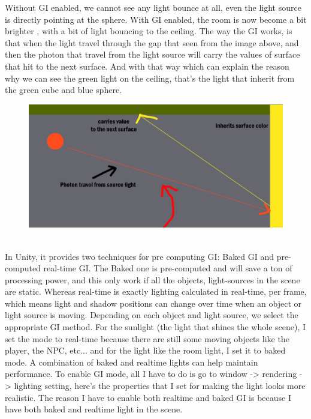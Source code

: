 \documentclass[a4paper, 13pt]{extarticle}
\begin{document}
{\begin{figure}[h]
 \end{figure}
 Without GI enabled, we cannot see any light bounce at all, even the light source is directly pointing at the sphere. With GI enabled, the room is now become a bit brighter , with a bit of light bouncing to the ceiling. The way the GI works, is that when the light travel through the gap that seen from the image above, and then the photon that travel from the light source will carry the values of surface that hit to the next surface. And with that way which can explain the reason why we can see the green light on the ceiling, that's the light that inherit from the green cube and blue sphere. 
  \begin{figure}[h]
 	\begin{minipage}{1\textwidth}
 		\centering
 		\includegraphics[width=0.8\linewidth]{intructions/How_light_works.png}
 		\centering
 	\end{minipage}
 \end{figure}
\\[0.05cm]
 In Unity, it provides two techniques for pre computing GI: Baked GI and pre-computed real-time GI. The Baked one is pre-computed and will save a ton of processing power, and this only work if all the objects, light-sources in the scene are static. Whereas real-time is exactly lighting calculated in real-time, per frame, which means light and shadow positions can change over time when an object or light source is moving. Depending on each object and light source, we select the appropriate GI method. For the sunlight (the light that shines the whole scene), I set the mode to real-time because there are still some moving objects like the player, the NPC, etc... and for the light like the room light, I set it to baked mode. A combination of baked and realtime lights can help maintain performance. To enable GI mode, all I have to do is go to window -> rendering -> lighting setting, here's the properties that I set for making the light looks more realistic. The reason I have to enable both realtime and baked GI is because I have both baked and realtime light in the scene.
}
\end{document}
